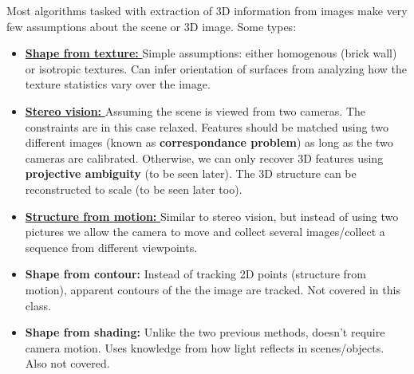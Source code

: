 \documentclass[a4paper,11pt]{article}
\begin{document}
Most algorithms tasked with extraction of 3D information from images make very few assumptions about the scene or 3D image. Some types:
\begin{itemize}
	\item \underline{\textbf{Shape from texture: }} Simple assumptions: either homogenous (brick wall) or isotropic textures. Can infer orientation of surfaces from analyzing how the texture statistics vary over the image.
	\item \underline{\textbf{Stereo vision: }} Assuming the scene is viewed from two cameras. The constraints are in this case relaxed. Features should be matched using two different images (known as \textbf{correspondance problem}) as long as the two cameras are calibrated. Otherwise, we can only recover 3D features using \textbf{projective ambiguity} (to be seen later). The 3D structure can be reconstructed to scale (to be seen later too).
	\item \underline{\textbf{Structure from motion: }} Similar to stereo vision, but instead of using two pictures we allow the camera to move and collect several images/collect a sequence from different viewpoints. 
	\item \textbf{Shape from contour: } Instead of tracking 2D points (structure from motion), apparent contours of the the image are tracked. Not covered in this class.
	\item \textbf{Shape from shading: } Unlike the two previous methods, doesn't require camera motion. Uses knowledge from how light reflects in scenes/objects. Also not covered.
\end{itemize}
\end{document}
